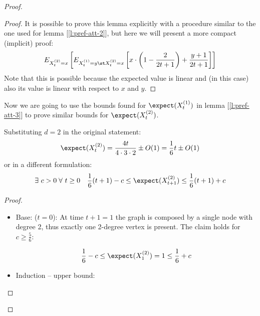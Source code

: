 \begin{proof}
{        \begin{proof}
            It is possible to prove this lemma explicitly with a procedure similar to the one used for lemma [\ref{l:pref-att-2}], but here we will present a more compact (implicit) proof:
            \[
                E_{X_t^{(2)}=x} \left[ E_{X_t^{(1)}=y \st X_t^{(2)}=x} \left[ x \cdot \left( 1 - \frac{2}{2t+1} \right) + \frac{y+1}{2t+1} \right] \right]
            \]
            Note that this is possible because the expected value is linear and (in this case) also its value is linear with respect to $x$ and $y$.
        \end{proof}
    }
    

    Now we are going to use the bounds found for $\expect(X_t^{(1)})$ in lemma [\ref{l:pref-att-3}] to prove similar bounds for $\expect(X_t^{(2)})$.
    
    \begin{lem}\label{l:pref-att-6} Substituting $d = 2$ in the original statement:
        \[
            \expect(X_t^{(2)}) = \frac{4 t}{4 \cdot 3 \cdot 2} \pm O(1) = \frac{1}{6} t \pm O(1)
        \]
        or in a different formulation:
        \[
            \exists\ c > 0\; \forall\ t\geq 0 \quad \frac{1}{6} (t + 1) - c \leq \expect( X_{t + 1}^{(2)} ) \leq \frac{1}{6} (t + 1) + c
        \]
    \end{lem}

    \begin{proof}

        \begin{itemize}
            \item Base: ($t = 0$): At time $t + 1 = 1$ the graph is composed by a single node with degree 2, thus exactly one 2-degree vertex is present. The claim holds for $c \geq \frac{5}{6}$:

            \[
                \frac{1}{6} - c \leq \expect(X_1^{(2)}) = 1 \leq \frac{1}{6} + c
            \]

            \item Induction -- upper bound:


\end{itemize}
\end{proof}
\end{proof}
